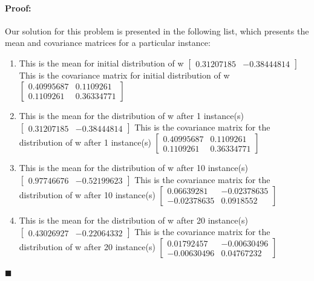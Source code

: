 \documentclass[12pt]{article}
\newenvironment{proof}{\paragraph{Proof: }}{\hfill$\blacksquare$}
\begin{document}
\begin{proof}
Our solution for this problem is presented in the following list, which presents the mean and covariance matrices for a particular instance:

\begin{enumerate}
\item This is the mean for initial distribution of w $\left[\begin{matrix} 0.31207185 & -0.38444814\end{matrix}\right]$
This is the covariance matrix for initial distribution of w $\left[ \begin{matrix} 0.40995687 & 0.1109261 \\  0.1109261  & 0.36334771 \end{matrix} \right]$

\item This is the mean for the distribution of w after 1 instance(s) $\left[\begin{matrix}  0.31207185 & -0.38444814\end{matrix}\right]$
This is the covariance matrix for the distribution of w after 1 instance(s) $\left[ \begin{matrix} 0.40995687 & 0.1109261 \\ 0.1109261  & 0.36334771\end{matrix} \right]$

\item This is the mean for the distribution of w after 10 instance(s) $\left[\begin{matrix}  0.97746676& -0.52199623\end{matrix}\right]$
This is the covariance matrix for the distribution of w after 10 instance(s) $\left[ \begin{matrix}  0.06639281 & -0.02378635 \\ -0.02378635 & 0.0918552  \end{matrix} \right]$

\item This is the mean for the distribution of w after 20 instance(s) $\left[\begin{matrix}  0.43026927 &-0.22064332\end{matrix}\right]$
This is the covariance matrix for the distribution of w after 20 instance(s) $\left[ \begin{matrix}  0.01792457 & -0.00630496 \\ -0.00630496 & 0.04767232 \end{matrix} \right]$


\end{enumerate}
\end{proof}
\end{document}
